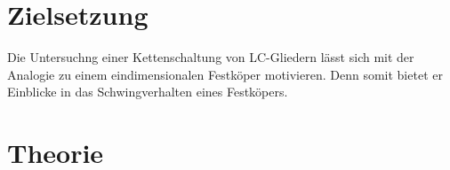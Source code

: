 \setcounter{page}{1}
\section*{Zielsetzung}
Die Untersuchng einer Kettenschaltung von LC-Gliedern lässt sich mit der Analogie  
zu einem eindimensionalen Festköper motivieren.
Denn somit bietet er Einblicke in das Schwingverhalten eines 
Festköpers.

\section{Theorie}

